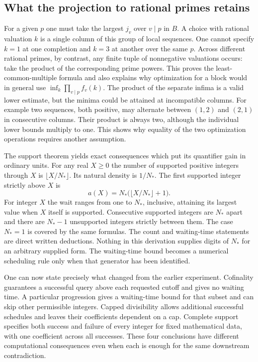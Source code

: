 \documentclass[12pt,letterpaper]{article}
\begin{document}
\subsection{What the projection to rational primes retains}
For a given $p$ one must take the largest $j_v$ over $v\mid p$ in $B$. A choice with rational valuation $k$ is a single column of this group of local sequences. One cannot specify $k=1$ at one completion and $k=3$ at another over the same $p$. Across different rational primes, by contrast, any finite tuple of nonnegative valuations occurs: take the product of the corresponding prime powers. This proves the least-common-multiple formula and also explains why optimization for a block would in general use $\inf_k\prod_{v\mid p}f_v(k)$. The product of the separate infima is a valid lower estimate, but the minima could be attained at incompatible columns. For example two sequences, both positive, may alternate between $(1,2)$ and $(2,1)$ in consecutive columns. Their product is always two, although the individual lower bounds multiply to one. This shows why equality of the two optimization operations requires another assumption.

The support theorem yields exact consequences which put its quantifier gain in ordinary units. For any real $X\ge0$ the number of supported positive integers through $X$ is $\lfloor X/N_*\rfloor$. Its natural density is $1/N_*$. The first supported integer strictly above $X$ is
\[
        a(X)=N_*\bigl(\lfloor X/N_*\rfloor+1\bigr).
\]
For integer $X$ the wait ranges from one to $N_*$, inclusive, attaining its largest value when $X$ itself is supported. Consecutive supported integers are $N_*$ apart and there are $N_*-1$ unsupported integers strictly between them. The case $N_*=1$ is covered by the same formulas. The count and waiting-time statements are direct written deductions. Nothing in this derivation supplies digits of $N_*$ for an arbitrary supplied form. The waiting-time bound becomes a numerical scheduling rule only when that generator has been identified.

One can now state precisely what changed from the earlier experiment. Cofinality guarantees a successful query above each requested cutoff and gives no waiting time. A particular progression gives a waiting-time bound for that subset and can skip other permissible integers. Capped divisibility allows additional successful schedules and leaves their coefficients dependent on a cap. Complete support specifies both success and failure of every integer for fixed mathematical data, with one coefficient across all successes. These four conclusions have different computational consequences even when each is enough for the same downstream contradiction.
\end{document}
